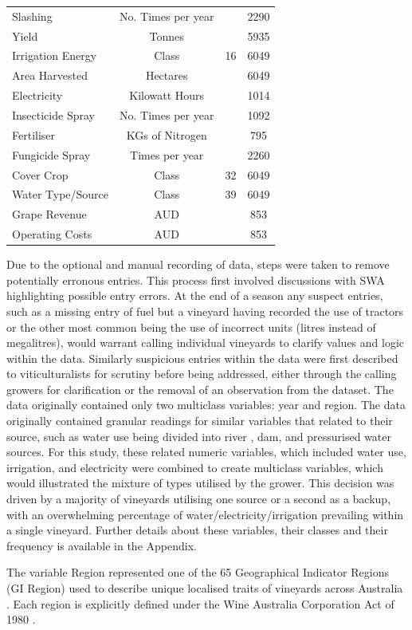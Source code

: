 \documentclass[review,12pt,authoryear]{elsarticle}
\begin{document}
\begin{linenumbers}
\begin{table}[]
\begin{tabular}{@{}lccc@{}}
  Slashing & No. Times per year &  & 2290 \\
  Yield & Tonnes &  & 5935 \\
  Irrigation Energy & Class & 16 & 6049 \\
  Area Harvested & Hectares &  & 6049 \\
  Electricity & Kilowatt Hours &  & 1014 \\
  Insecticide Spray & No. Times per year &  & 1092 \\
  Fertiliser & KGs of Nitrogen &  & 795 \\
  Fungicide Spray & Times per year &  & 2260 \\
  Cover Crop & Class & 32 & 6049 \\
  Water Type/Source & Class & 39 & 6049 \\
  Grape Revenue & AUD &  & 853 \\
  Operating Costs & AUD &  & 853 \\ \bottomrule
  \end{tabular}
  \end{table}
\normalsize
Due to the optional and manual recording of data, steps were taken to remove potentially erronous entries. This process first involved discussions with SWA highlighting possible entry errors. At the end of a season any suspect entries, such as a missing entry of fuel but a vineyard having recorded the use of tractors or the other most common being the use of incorrect units (litres instead of megalitres), would warrant calling individual vineyards to clarify values and logic within the data. Similarly suspicious entries within the data were first described to viticulturalists for scrutiny before being addressed, either through the calling growers for clarification or the removal of an observation from the dataset. The data originally contained only two multiclass variables: year and region. The data originally contained granular readings for similar variables that related to their source, such as water use being divided into river , dam, and pressurised water sources. For this study, these related numeric variables, which included water use, irrigation, and electricity were combined to create multiclass variables, which would illustrated the mixture of types utilised by the grower. This decision was driven by a majority of vineyards utilising one source or a second as a backup, with an overwhelming percentage of water/electricity/irrigation prevailing within a single vineyard. Further details about these variables, their classes and their frequency is available in the Appendix. 
\par
The variable Region represented one of the 65 Geographical Indicator Regions (GI Region) used to describe unique localised traits of vineyards across Australia \citep{hallidayAustralianWineEncyclopedia2009,oliverReviewSoilPhysical2013,soarClimateDriversRed2008}. Each region is explicitly defined under the Wine Australia Corporation Act of 1980 \citep{attorney-generalsdepartmentWineAustraliaCorporation2010}.
\par


\end{linenumbers}
\end{document}
